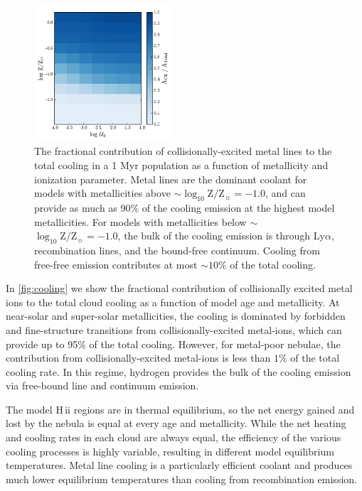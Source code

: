 \documentclass[trackchanges, twocolumn, tighten]{aastex61}
\newcommand{\Fig}[1]{\autoref{fig:#1}}
\newcommand{\logten}{\ensuremath{\log_{10}}}
\newcommand{\hii}{H\,{\sc ii}\xspace}
\newcommand{\logZeq}[1]{\ensuremath{\logten \mathrm{Z}/\mathrm{Z}_{\sun} = #1}}
\begin{document}
\begin{figure} %
  \begin{centering}
    \includegraphics[width=0.45\textwidth]{f5.pdf}
    \caption{The fractional contribution of collisionally-excited metal lines to the total cooling in a 1 Myr population as a function of metallicity and ionization parameter. Metal lines are the dominant coolant for models with metallicities above $\sim$\logZeq{-1.0}, and can provide as much as 90\% of the cooling emission at the highest model metallicities. For models with metallicities below $\sim$\logZeq{-1.0}, the bulk of the cooling emission is through Ly$\alpha$, recombination lines, and the bound-free continuum. Cooling from free-free emission contributes at most ${\sim}10\%$ of the total cooling. }
    \label{fig:cooling}
  \end{centering}
\end{figure}

In \Fig{cooling} we show the fractional contribution of collisionally excited metal ions to the total cloud cooling as a function of model age and metallicity. At near-solar and super-solar metallicities, the cooling is dominated by forbidden and fine-structure transitions from collisionally-excited metal-ions, which can provide up to 95\% of the total cooling. However, for metal-poor nebulae, the contribution from collisionally-excited metal-ions is less than $1\%$ of the total cooling rate. In this regime, hydrogen provides the bulk of the cooling emission via free-bound line and continuum emission.

The model \hii regions are in thermal equilibrium, so the net energy gained and lost by the nebula is equal at every age and metallicity. While the net heating and cooling rates in each cloud are always equal, the efficiency of the various cooling processes is highly variable, resulting in different model equilibrium temperatures. Metal line cooling is a particularly efficient coolant and produces much lower equilibrium temperatures than cooling from recombination emission.
\end{document}
